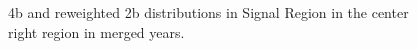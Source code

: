 \begin{figure}[ht]
 

    \caption{4b and reweighted 2b distributions in Signal Region in the center right region in merged years.}
    \label{fig:center-right-4bvbf-SR-all}
\end{figure}


